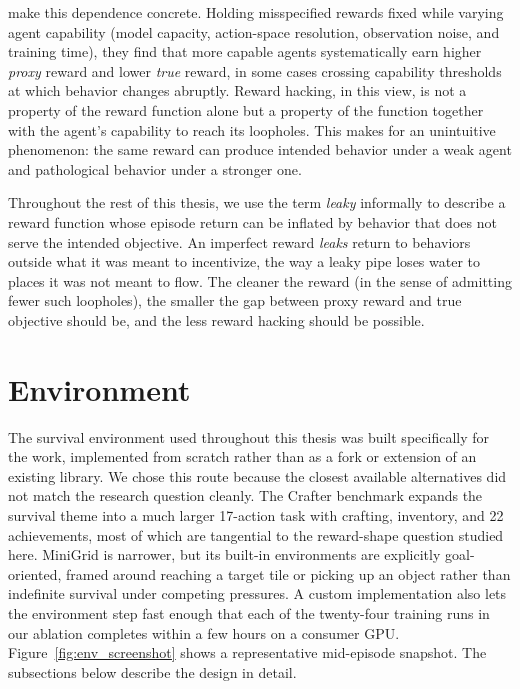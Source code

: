\documentclass[12pt,a4paper,titlepage]{article}
\begin{document}
\citet{Pan2022} make this dependence concrete. Holding misspecified rewards fixed while varying agent capability (model capacity, action-space resolution, observation noise, and training time), they find that more capable agents systematically earn higher \emph{proxy} reward and lower \emph{true} reward, in some cases crossing capability thresholds at which behavior changes abruptly. Reward hacking, in this view, is not a property of the reward function alone but a property of the function together with the agent's capability to reach its loopholes. This makes for an unintuitive phenomenon: the same reward can produce intended behavior under a weak agent and pathological behavior under a stronger one.

Throughout the rest of this thesis, we use the term \emph{leaky} informally to describe a reward function whose episode return can be inflated by behavior that does not serve the intended objective. An imperfect reward \emph{leaks} return to behaviors outside what it was meant to incentivize, the way a leaky pipe loses water to places it was not meant to flow. The cleaner the reward (in the sense of admitting fewer such loopholes), the smaller the gap between proxy reward and true objective should be, and the less reward hacking should be possible.

\section{Environment}
\label{sec:environment}

The survival environment used throughout this thesis was built specifically for the work, implemented from scratch rather than as a fork or extension of an existing library. We chose this route because the closest available alternatives did not match the research question cleanly. The Crafter benchmark \citep{Hafner2022} expands the survival theme into a much larger 17-action task with crafting, inventory, and 22 achievements, most of which are tangential to the reward-shape question studied here. MiniGrid \citep{ChevalierBoisvert2023} is narrower, but its built-in environments are explicitly goal-oriented, framed around reaching a target tile or picking up an object rather than indefinite survival under competing pressures. A custom implementation also lets the environment step fast enough that each of the twenty-four training runs in our ablation completes within a few hours on a consumer GPU. Figure~\ref{fig:env_screenshot} shows a representative mid-episode snapshot. The subsections below describe the design in detail.
\end{document}
